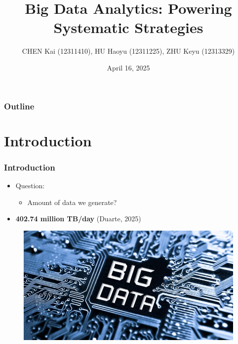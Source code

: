 \documentclass{beamer}
\title[Big Data Analytics]{Big Data Analytics: Powering Systematic Strategies}
\author[CHEN Kai,HU Haoyu,ZHU Keyu]{CHEN Kai (12311410), HU Haoyu (12311225), ZHU Keyu (12313329)}
\institute[SUSTech]{Southern University of Science and Technology}
\date{April 16, 2025}
\begin{document}
\begin{frame}
 \maketitle
\end{frame}



\begin{frame}
\frametitle{Outline}
 \tableofcontents
\end{frame}



\section{Introduction}
\begin{frame}
\frametitle{Introduction}
\begin{minipage}{\textwidth}
{\linespread{1.5}
\begin{itemize}
\setlength{\itemsep}{10pt}
    \item <1-> {\LARGE Question:} \\ 
    \begin{itemize}
        \item {\Large Amount of data we generate?}
    \end{itemize}
    \item <2-> {\LARGE \textbf{402.74 million TB/day}} (Duarte, 2025)
\end{itemize}
}
\begin{figure}
    \centering
    \includegraphics[width=0.5\linewidth]{figure 1.png}
    \label{fig:enter-label}
\end{figure}
\end{minipage}
\end{frame} 
\end{document}
